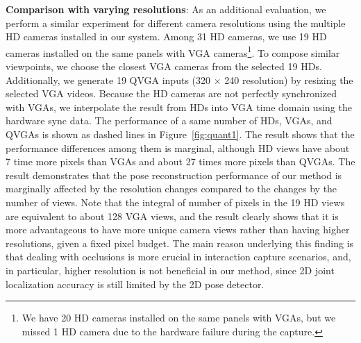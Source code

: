 
\textbf{Comparison with varying resolutions}: As an additional evaluation, we perform a similar experiment for different camera resolutions using the multiple HD cameras installed in our system. Among 31 HD cameras, we use 19 HD cameras installed on the same panels with VGA cameras\footnote{We have 20 HD cameras installed on the same panels with VGAs, but we missed 1 HD camera due to the hardware failure during the capture.}.  To compose similar viewpoints, we choose the closest VGA cameras from the selected 19 HDs. Additionally, we generate 19 QVGA inputs (320 $\times$ 240 resolution)  by resizing the selected VGA videos. Because the HD cameras are not perfectly synchronized with VGAs, we interpolate the result from HDs into VGA time domain using the hardware sync data. The performance of a same number of HDs, VGAs, and QVGAs is shown as dashed lines in Figure~\ref{fig:quant1}. The result shows that the performance differences among them is marginal, although HD views have about 7 time more pixels than VGAs and about 27 times more pixels than QVGAs. The result demonstrates that the pose reconstruction performance of our method is marginally affected by the resolution changes compared to the changes by the number of views. Note that the integral of number of pixels in the 19 HD views are equivalent to about 128 VGA views, and the result clearly shows that it is more advantageous to have more unique camera views rather than having higher resolutions, given a fixed pixel budget. The main reason underlying this finding is that dealing with occlusions is more crucial in interaction capture scenarios, and, in particular, higher resolution is not beneficial in our method, since 2D joint localization accuracy is still limited by the 2D pose detector.

